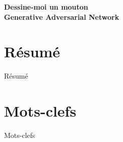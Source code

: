 
\newpage

{
\setlength{\baselineskip}{14pt}
\setlength{\parindent}{0pt}
\setlength{\parskip}{8pt}

\begin{center}

\noindent \textbf{\huge
Dessine-moi un mouton\\[8pt]
Generative Adversarial Network
}


\end{center}

\section*{Résumé}


Résumé


\section*{Mots-clefs}


Mots-clefs

}

\newpage %
